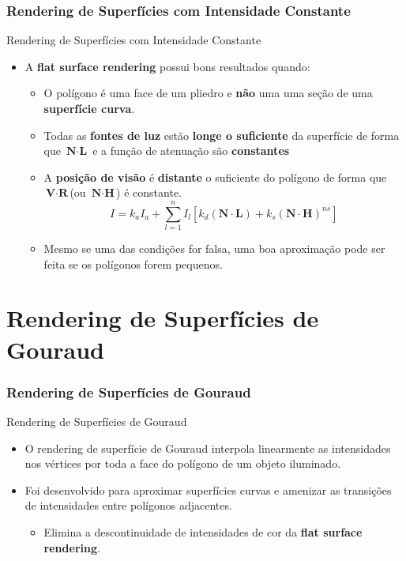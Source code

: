 \documentclass{beamer}
\begin{document}
\begin{frame}
\frametitle{Rendering de Superfícies com Intensidade Constante}

		\begin{block}{Rendering de Superfícies com Intensidade Constante}
		\begin{itemize}
			\item A \textbf{flat surface rendering} possui bons resultados quando:
			\begin{itemize}
				\item O polígono é uma face de um pliedro e \textbf{não} uma uma seção de uma \textbf{superfície curva}.
				\item Todas as \textbf{fontes de luz} estão \textbf{longe o suficiente} da superfície de forma que $\textbf{N} \cdot \textbf{L}$ e a função de atenuação são \textbf{constantes} 
				\item A \textbf{posição de visão} é \textbf{distante} o suficiente do polígono de forma que $\textbf{V} \cdot \textbf{R}$(ou $\textbf{N} \cdot \textbf{H}$) é constante.\\
				\begin{equation*}
					I=k_aI_a + \sum_{l=1}^n I_l[k_d(\textbf{N} \cdot \textbf{L}) +k_s(\textbf{N}\cdot \textbf{H})^{ns}]
				\end{equation*}
				\item Mesmo se uma das condições for falsa, uma boa aproximação pode ser feita se os polígonos forem pequenos.
			\end{itemize}
		\end{itemize}
	\end{block}
	
\end{frame}


\section{Rendering de Superfícies de Gouraud}
\begin{frame}
\frametitle{Rendering de Superfícies de Gouraud}

		\begin{block}{Rendering de Superfícies de Gouraud}
		\begin{itemize}
			\item O rendering de superfície de Gouraud interpola linearmente as intensidades nos vértices por toda a face do polígono de um objeto iluminado.
			\item Foi desenvolvido para aproximar superfícies curvas e amenizar as transições de intensidades entre polígonos adjacentes.
			\begin{itemize}
				\item Elimina a descontinuidade de intensidades de cor da \textbf{flat surface rendering}.
			\end{itemize}
		\end{itemize}
	\end{block}
	
\end{frame}
\end{document}
